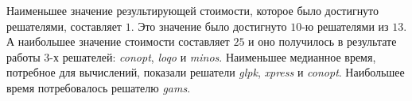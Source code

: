 Наименьшее значение результирующей стоимости, которое было достигнуто решателями, составляет $1$. Это значение было достигнуто $10$-ю решателями из $13$. А наибольшее значение стоимости составляет $25$ и оно получилось в результате работы $3$-х решателей: \textit{conopt}, \textit{loqo} и \textit{minos}. Наименьшее медианное время, потребное для вычислений, показали решатели \textit{glpk}, \textit{xpress} и \textit{conopt}. Наибольшее время потребовалось решателю \textit{gams}.

